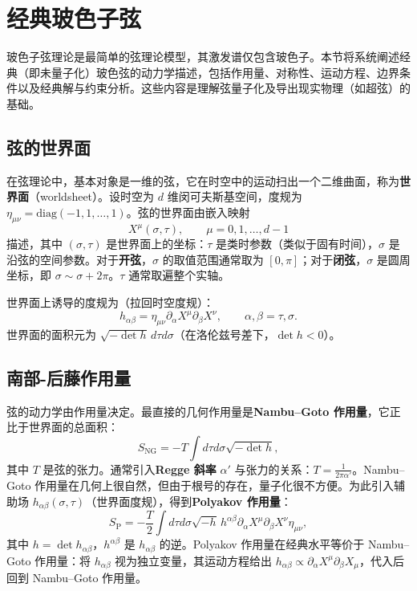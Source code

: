 \section{经典玻色子弦}
玻色子弦理论是最简单的弦理论模型，其激发谱仅包含玻色子。本节将系统阐述经典（即未量子化）玻色弦的动力学描述，包括作用量、对称性、运动方程、边界条件以及经典解与约束分析。这些内容是理解弦量子化及导出现实物理（如超弦）的基础。

\subsection*{弦的世界面}

在弦理论中，基本对象是一维的弦，它在时空中的运动扫出一个二维曲面，称为\textbf{世界面}（worldsheet）。设时空为 $d$ 维闵可夫斯基空间，度规为 $\eta_{\mu\nu} = \mathrm{diag}(-1,1,\dots,1)$。弦的世界面由嵌入映射
\begin{equation}
X^\mu(\sigma,\tau),\qquad \mu=0,1,\dots,d-1
\end{equation}
描述，其中 $(\sigma,\tau)$ 是世界面上的坐标：$\tau$ 是类时参数（类似于固有时间），$\sigma$ 是沿弦的空间参数。对于\textbf{开弦}，$\sigma$ 的取值范围通常取为 $[0,\pi]$；对于\textbf{闭弦}，$\sigma$ 是圆周坐标，即 $\sigma \sim \sigma+2\pi$。$\tau$ 通常取遍整个实轴。

世界面上诱导的度规为（拉回时空度规）：
\begin{equation}
h_{\alpha\beta} = \eta_{\mu\nu} \partial_\alpha X^\mu \partial_\beta X^\nu,\qquad \alpha,\beta = \tau,\sigma.
\end{equation}
世界面的面积元为 $\sqrt{-\det h}\, d\tau d\sigma$（在洛伦兹号差下，$\det h<0$）。

\subsection*{南部-后藤作用量}

弦的动力学由作用量决定。最直接的几何作用量是\textbf{Nambu–Goto 作用量}，它正比于世界面的总面积：
\begin{equation}
S_{\mathrm{NG}} = -T \int d\tau d\sigma \sqrt{-\det h},
\end{equation}
其中 $T$ 是弦的张力。通常引入\textbf{Regge 斜率} $\alpha'$ 与张力的关系：$T = \frac{1}{2\pi\alpha'}$。Nambu–Goto 作用量在几何上很自然，但由于根号的存在，量子化很不方便。为此引入辅助场 $h_{\alpha\beta}(\sigma,\tau)$（世界面度规），得到\textbf{Polyakov 作用量}：
\begin{equation}
S_{\mathrm{P}} = -\frac{T}{2} \int d\tau d\sigma \sqrt{-h}\, h^{\alpha\beta} \partial_\alpha X^\mu \partial_\beta X^\nu \eta_{\mu\nu},
\end{equation}
其中 $h = \det h_{\alpha\beta}$，$h^{\alpha\beta}$ 是 $h_{\alpha\beta}$ 的逆。Polyakov 作用量在经典水平等价于 Nambu–Goto 作用量：将 $h_{\alpha\beta}$ 视为独立变量，其运动方程给出 $h_{\alpha\beta} \propto \partial_\alpha X^\mu \partial_\beta X_\mu$，代入后回到 Nambu–Goto 作用量。

